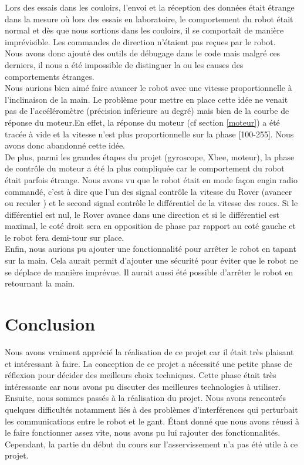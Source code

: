 Lors des essais dans les couloirs, l'envoi et la réception des données était étrange dans la mesure où lors des essais en laboratoire, le comportement du robot était normal et dès que nous sortions dans les couloirs, il se comportait de manière imprévisible. Les commandes de direction n'étaient pas reçues par le robot.\\
Nous avons donc ajouté des outils de débugage dans le code mais malgré ces derniers, il nous a été impossible de distinguer la ou les causes des comportements étranges.\\

Nous aurions bien aimé faire avancer le robot avec une vitesse proportionnelle à l'inclinaison de la main. Le problème pour mettre en place cette idée ne venait pas de l'accéléromètre (précision inférieure au degré) mais bien de la courbe de réponse du moteur.En effet, la réponse du moteur (cf section \ref{moteur}) a été tracée à vide et la vitesse n'est plus proportionnelle sur la phase [100-255]. Nous avons donc abandonné cette idée. \\
De plus, parmi les grandes étapes du projet (gyroscope, Xbee, moteur), la phase de contrôle du moteur a été la plus compliquée car le comportement du robot était parfois étrange. Nous avons vu que le robot était en mode  façon engin radio commandé, c'est à dire que l'un des signal contrôle la vitesse du Rover (avancer ou reculer ) et le second signal contrôle le différentiel de la vitesse des roues. Si le différentiel est nul, le Rover avance dans une direction et si le différentiel est maximal, le coté droit sera en opposition de phase par rapport au coté gauche et le robot fera demi-tour sur place.\\

Enfin, nous aurions pu ajouter une fonctionnalité pour arrêter le robot en tapant sur la main. Cela aurait permit d'ajouter une sécurité pour éviter que le robot ne se déplace de manière imprévue.
Il aurait aussi été possible d'arrêter le robot en retournant la main.




\chapter{Conclusion}

Nous avons vraiment apprécié la réalisation de ce projet car il était très plaisant et intéressant à faire. La conception de ce projet a nécessité une petite phase de réflexion pour décider des meilleurs choix techniques. Cette phase était très intéressante car nous avons pu discuter des meilleures technologies à utiliser. 
Ensuite, nous sommes passés à la réalisation du projet. Nous avons rencontrés quelques difficultés notamment liés à des problèmes d'interférences qui perturbait les communications entre le robot et le gant. 
Étant donné que nous avons réussi à le faire fonctionner assez vite, nous avons pu lui rajouter des fonctionnalités.
Cependant, la partie du début du cours sur l'asservissement n'a pas été utile à ce projet.




